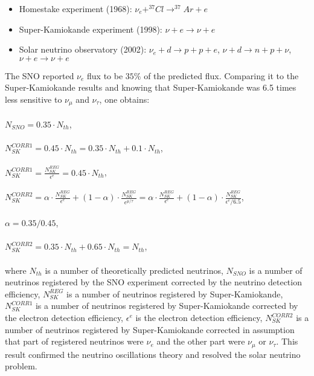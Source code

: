 \begin{itemize}
\item Homestake experiment (1968): $\nu_e + ^{37}Cl \rightarrow ^{37}Ar+e$
\item Super-Kamiokande experiment (1998): $\nu + e \rightarrow \nu + e$ 
\item Solar neutrino observatory (2002): $\nu_e + d \rightarrow p+p+e$, $\nu+d \rightarrow n+p+\nu$, $\nu+e \rightarrow \nu+e$
\end{itemize}
The SNO reported $\nu_e$ flux to be $35\%$ of the predicted flux. Comparing it to the Super-Kamiokande results and knowing that Super-Kamiokande was 6.5 times less sensitive to $\nu_\mu$ and $\nu_\tau$, one obtains:\\ \\
$N_{SNO}=0.35 \cdot N_{th}$,\\ \\
$N_{SK}^{CORR1}=0.45 \cdot N_{th}=0.35 \cdot N_{th}+0.1 \cdot N_{th}$,\\ \\
$N_{SK}^{CORR1}=\frac{N_{SK}^{REG}}{\epsilon^{e}}=0.45 \cdot N_{th} $,\\ \\
$N_{SK}^{CORR2}=\alpha \cdot \frac{N_{SK}^{REG}}{\epsilon^{e}}+(1-\alpha) \cdot \frac{N_{SK}^{REG}}{\epsilon^{\mu/\tau}}=\alpha \cdot \frac{N_{SK}^{REG}}{\epsilon^{e}}+(1-\alpha) \cdot \frac{N_{SK}^{REG}}{\epsilon^{e}/6.5}$,\\ \\
$\alpha=0.35/0.45$,\\ \\
$N_{SK}^{CORR2}=0.35 \cdot N_{th}+0.65 \cdot N_{th}=N_{th}$,\\ \\
where $N_{th}$ is a number of theoretically predicted neutrinos, $N_{SNO}$ is a number of neutrinos registered by the SNO experiment corrected by the neutrino detection efficiency, $N_{SK}^{REG}$ is a number of neutrinos registered by Super-Kamiokande, $N_{SK}^{CORR1}$ is a number of neutrinos registered by Super-Kamiokande corrected by the electron detection efficiency, $\epsilon^{e}$ is the electron detection efficiency, $N_{SK}^{CORR2}$ is a number of neutrinos registered by Super-Kamiokande corrected in assumption that part of registered neutrinos were $\nu_e$ and the other part were $\nu_\mu$ or $\nu_\tau$. This result confirmed the neutrino oscillations theory and resolved the solar neutrino problem.\\ \\
